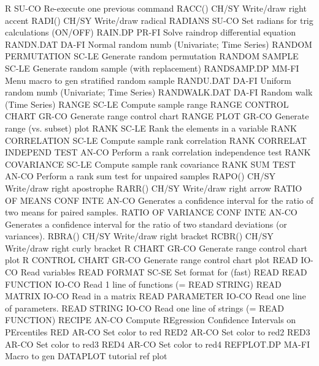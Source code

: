 R                           SU-CO Re-execute one previous command
RACC()                      CH/SY Write/draw right accent
RADI()                      CH/SY Write/draw radical
RADIANS                     SU-CO Set radians for trig calculations (ON/OFF)
RAIN.DP                     PR-FI Solve raindrop differential equation 
RANDN.DAT                   DA-FI Normal random numb (Univariate; Time Series)
RANDOM PERMUTATION          SC-LE Generate random permutation
RANDOM SAMPLE               SC-LE Generate random sample (with replacement)
RANDSAMP.DP                 MM-FI Menu macro to gen stratified random sample
RANDU.DAT                   DA-FI Uniform random numb (Univariate; Time Series)
RANDWALK.DAT                DA-FI Random walk (Time Series)
RANGE                       SC-LE Compute sample range
RANGE CONTROL CHART         GR-CO Generate range control chart
RANGE PLOT                  GR-CO Generate range (vs. subset) plot
RANK                        SC-LE Rank the elements in a variable
RANK CORRELATION            SC-LE Compute sample rank correlation
RANK CORRELAT INDEPEND TEST AN-CO Perform a rank correlation independence test
RANK COVARIANCE             SC-LE Compute sample rank covariance
RANK SUM TEST               AN-CO Perform a rank sum test for unpaired samples
RAPO()                      CH/SY Write/draw right apostrophe
RARR()                      CH/SY Write/draw right arrow
RATIO OF MEANS CONF INTE    AN-CO Generates a confidence interval for the ratio of two means for paired samples.
RATIO OF VARIANCE CONF INTE AN-CO Generates a confidence interval for the ratio of two standard deviations (or variances).
RBRA()                      CH/SY Write/draw right bracket
RCBR()                      CH/SY Write/draw right curly bracket
R CHART                     GR-CO Generate range control chart plot
R CONTROL CHART             GR-CO Generate range control chart plot
READ                        IO-CO Read variables
READ FORMAT                 SC-SE Set format for (fast) READ
READ FUNCTION               IO-CO Read 1 line of functions (= READ STRING)
READ MATRIX                 IO-CO Read in a matrix
READ PARAMETER              IO-CO Read one line of parameters.
READ STRING                 IO-CO Read one line of strings (= READ FUNCTION)
RECIPE                      AN-CO Compute REgression Confidence Intervals on PErcentiles
RED                         AR-CO Set color to red
RED2                        AR-CO Set color to red2
RED3                        AR-CO Set color to red3
RED4                        AR-CO Set color to red4
REFPLOT.DP                  MA-FI Macro to gen DATAPLOT tutorial ref plot
